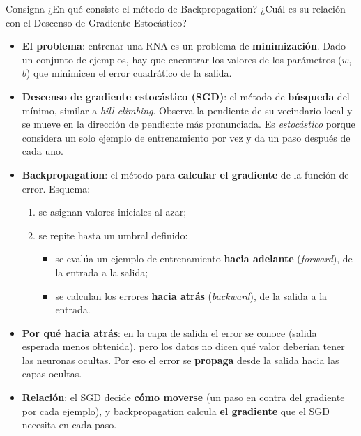 \documentclass[11pt,a4paper]{article}
\begin{document}
\begin{enunciado}{Consigna}
¿En qué consiste el método de Backpropagation? ¿Cuál es su relación con el Descenso de Gradiente Estocástico?
\end{enunciado}

\begin{itemize}
  \item \textbf{El problema}: entrenar una RNA es un problema de \textbf{minimización}. Dado un conjunto de ejemplos, hay que encontrar los valores de los parámetros ($w$, $b$) que minimicen el error cuadrático de la salida.
  \item \textbf{Descenso de gradiente estocástico (SGD)}: el método de \textbf{búsqueda} del mínimo, similar a \textit{hill climbing}. Observa la pendiente de su vecindario local y se mueve en la dirección de pendiente más pronunciada. Es \textit{estocástico} porque considera un solo ejemplo de entrenamiento por vez y da un paso después de cada uno.
  \item \textbf{Backpropagation}: el método para \textbf{calcular el gradiente} de la función de error. Esquema:
  \begin{enumerate}
    \item se asignan valores iniciales al azar;
    \item se repite hasta un umbral definido:
    \begin{itemize}
      \item se evalúa un ejemplo de entrenamiento \textbf{hacia adelante} (\textit{forward}), de la entrada a la salida;
      \item se calculan los errores \textbf{hacia atrás} (\textit{backward}), de la salida a la entrada.
    \end{itemize}
  \end{enumerate}
  \item \textbf{Por qué hacia atrás}: en la capa de salida el error se conoce (salida esperada menos obtenida), pero los datos no dicen qué valor deberían tener las neuronas ocultas. Por eso el error se \textbf{propaga} desde la salida hacia las capas ocultas.
  \item \textbf{Relación}: el SGD decide \textbf{cómo moverse} (un paso en contra del gradiente por cada ejemplo), y backpropagation calcula \textbf{el gradiente} que el SGD necesita en cada paso.
\end{itemize}
\end{document}

